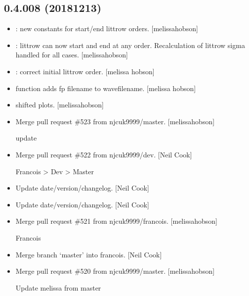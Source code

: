 \documentclass[a4paper,10pt,english]{report}
\begin{document}
\subsection{0.4.008 (2018\sphinxhyphen{}12\sphinxhyphen{}13)}
\label{\detokenize{misc/changelog:id255}}\begin{itemize}
\item {} 
: new constants for start/end littrow orders.
{[}melissa\sphinxhyphen{}hobson{]}

\item {} 
: littrow can now start and end at any order.
Recalculation of littrow sigma handled for all cases. {[}melissa\sphinxhyphen{}hobson{]}

\item {} 
: correct initial littrow order. {[}melissa\sphinxhyphen{}
hobson{]}

\item {} 
 function adds fp filename to wavefilename. {[}melissa\sphinxhyphen{}
hobson{]}

\item {} 
 shifted plots. {[}melissa\sphinxhyphen{}hobson{]}

\item {} 
Merge pull request \#523 from njcuk9999/master. {[}melissa\sphinxhyphen{}hobson{]}

update

\item {} 
Merge pull request \#522 from njcuk9999/dev. {[}Neil Cook{]}

Francois \textendash{}\textgreater{} Dev \textendash{}\textgreater{} Master

\item {} 
Update date/version/changelog. {[}Neil Cook{]}

\item {} 
Update date/version/changelog. {[}Neil Cook{]}

\item {} 
Merge pull request \#521 from njcuk9999/francois. {[}melissa\sphinxhyphen{}hobson{]}

Francois

\item {} 
Merge branch ‘master’ into francois. {[}Neil Cook{]}

\item {} 
Merge pull request \#520 from njcuk9999/master. {[}melissa\sphinxhyphen{}hobson{]}

Update melissa from master

\end{itemize}
\end{document}
